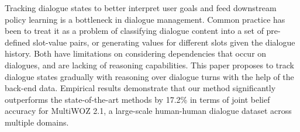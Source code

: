 Tracking dialogue states to better interpret user goals and feed downstream policy learning is a bottleneck in dialogue management. Common practice has been to treat it as a problem of classifying dialogue content into a set of pre-defined slot-value pairs, or generating values for different slots given the dialogue history. Both have limitations on considering dependencies that occur on dialogues, and are lacking of reasoning capabilities. This paper proposes to track dialogue states gradually with reasoning over dialogue turns with the help of the back-end data. Empirical results demonstrate that our method significantly outperforms the state-of-the-art methods by 17.2\% in terms of joint belief accuracy for MultiWOZ 2.1, a large-scale human-human dialogue dataset across multiple domains.
